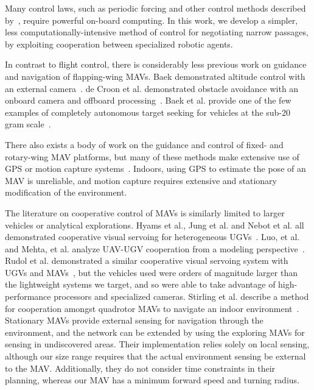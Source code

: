 \documentclass{aamas2013}
\begin{document}
Many control laws, such as periodic forcing and other control methods 
described by~\cite{doman:dynamics}\cite{khan:longitudinal_control}\cite{leonard:averaging}, 
require powerful on-board computing. In this work, we develop a simpler, 
less computationally-intensive method of control for negotiating narrow 
passages, by exploiting cooperation between specialized robotic agents.

In contrast to flight control, there is considerably less previous work on 
guidance and navigation of flapping-wing MAVs. Baek demonstrated altitude 
control with an external camera~\cite{baek:altitude}. de Croon et al. 
demonstrated obstacle avoidance with an onboard camera and offboard 
processing~\cite{delfly:avoid}. Baek et al. provide one of the few examples 
of completely autonomous target seeking for vehicles at the sub-20 gram 
scale~\cite{baek:tracking}.

There also exists a body of work on the guidance and control of fixed- and 
rotary-wing MAV platforms, but many of these methods make extensive use of 
GPS or motion capture systems~\cite{kanade:3dvision}\cite{kingston:timeattitude}. 
Indoors, using GPS to estimate the pose of an MAV is unreliable, and motion 
capture requires extensive and stationary modification of the environment. 

The literature on cooperative control of MAVs is similarly limited to larger
vehicles or analytical explorations. Hyams et al., Jung et al. and Nebot et
al. all demonstrated cooperative visual servoing for heterogeneous
UGVs~\cite{Hyams1999Cooperative}\cite{Jung1998Range}\cite{Nebot2003Agents}.
Luo, et al. and Mehta, et al. analyze UAV-UGV cooperation from a modeling
perspective~\cite{Luo2011Air}\cite{Mehta2006Adaptive}. Rudol et al.
demonstrated a similar cooperative visual servoing system with UGVs and
MAVs~\cite{Rudol2008Micro}, but the vehicles used were orders of magnitude
larger than the lightweight systems we target, and so were able to take
advantage of high-performance processors and specialized cameras. Stirling et
al. describe a method for cooperation amongst quadrotor MAVs to navigate an indoor
environment~\cite{SwarmStirling}. Stationary MAVs provide external sensing for
navigation through the environment, and the network can be extended by using
the exploring MAVs for sensing in undiscovered areas. Their implementation
relies solely on local sensing, although our size range requires that the
actual environment sensing be external to the MAV. Additionally, they do not
consider time constraints in their planning, whereas our MAV has a minimum
forward speed and turning radius.
\end{document}
